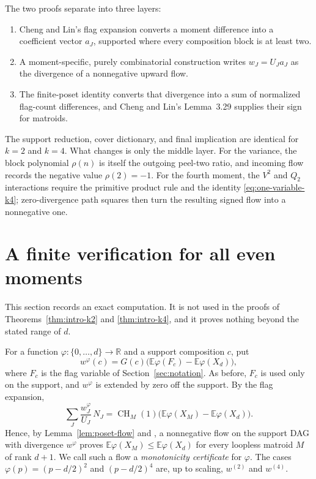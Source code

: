 \documentclass[11pt]{amsart}
\theoremstyle{definition}
\theoremstyle{remark}
\newcommand{\CH}{\operatorname{CH}}
\newcommand{\E}{\mathbb E}
\begin{document}
The two proofs separate into three layers:
\begin{enumerate}[label=\textup{(\roman*)}]
 \item Cheng and Lin's flag expansion converts a moment difference into a
 coefficient vector $a_J$, supported where every composition block is at
 least two.
 \item A moment-specific, purely combinatorial construction writes
 $w_J=U_Ja_J$ as the divergence of a nonnegative upward flow.
 \item The finite-poset identity converts that divergence into a sum of
 normalized flag-count differences, and Cheng and Lin's Lemma~3.29 supplies
 their sign for matroids.
\end{enumerate}
The support reduction, cover dictionary, and final implication are identical
for $k=2$ and $k=4$.  What changes is only the middle layer.  For the
variance, the block polynomial $\rho(n)$ is itself the outgoing
peel-two ratio, and incoming flow records the negative value
$\rho(2)=-1$.  For the fourth moment, the $V^2$ and $Q_2$ interactions
require the primitive product rule and the identity
\eqref{eq:one-variable-k4}; zero-divergence path squares then turn the
resulting signed flow into a nonnegative one.

\section{A finite verification for all even moments}
\label{sec:finite-all-k}

This section records an exact computation.  It is not used in the proofs of
Theorems~\ref{thm:intro-k2} and \ref{thm:intro-k4}, and it proves nothing
beyond the stated range of $d$.

For a function $\varphi:\{0,\ldots,d\}\to\mathbb R$ and a support
composition $c$, put
\begin{equation}
 w^{\varphi}(c)=G(c)\bigl(\E\varphi(F_c)-\E\varphi(X_d)\bigr),
 \label{eq:w-phi}
\end{equation}
where $F_c$ is the flag variable of Section~\ref{sec:notation}.  As before,
$F_c$ is used only on the support, and $w^{\varphi}$ is extended by zero off
the support.  By the flag expansion,
\[
 \sum_J\frac{w^{\varphi}_J}{U_J}\,N_J
 =\CH_M(1)\bigl(\E\varphi(X_M)-\E\varphi(X_d)\bigr).
\]
Hence, by Lemma~\ref{lem:poset-flow} and
\cite[Lemma~3.29]{ChengLin}, a nonnegative flow on the support DAG with
divergence $w^{\varphi}$ proves $\E\varphi(X_M)\le\E\varphi(X_d)$ for every
loopless matroid $M$ of rank $d+1$.  We call such a flow a
\emph{monotonicity certificate} for $\varphi$.  The cases
$\varphi(p)=(p-d/2)^2$ and $(p-d/2)^4$ are, up to scaling,
$w^{(2)}$ and $w^{(4)}$.
\end{document}

